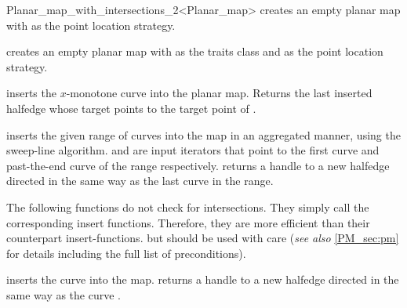 \begin{ccRefClass}{Planar_map_with_intersections_2<Planar_map>}
  {creates an empty planar map with  as the point location strategy.}

  {creates an empty planar map with  as the traits class and  as the point location strategy.}

\ccOperations

         {inserts the $x$-monotone curve  into the planar map.
	 Returns the last inserted halfedge whose target points to the
	 target point of .
	 }

  {inserts the given range of curves into the map in an aggregated manner,
   using the sweep-line algorithm.  and  are input 
   iterators that point to the first curve and past-the-end curve of the range
   respectively.  returns a handle to a new halfedge directed 
   in the same way as the last curve in the range.
   }

\begin{ccAdvanced}


The following functions do not check for intersections. They simply
call the  corresponding insert functions. Therefore,
they are more efficient than their counterpart insert-functions. but should
be used with care ({\em see also} \ref{PM_sec:pm} for details including the 
full list of preconditions).

         {inserts the curve  into the
	 map.  returns a handle to a new
	 halfedge directed in the same way as the curve .
	 }


\end{ccAdvanced}
\end{ccRefClass}
